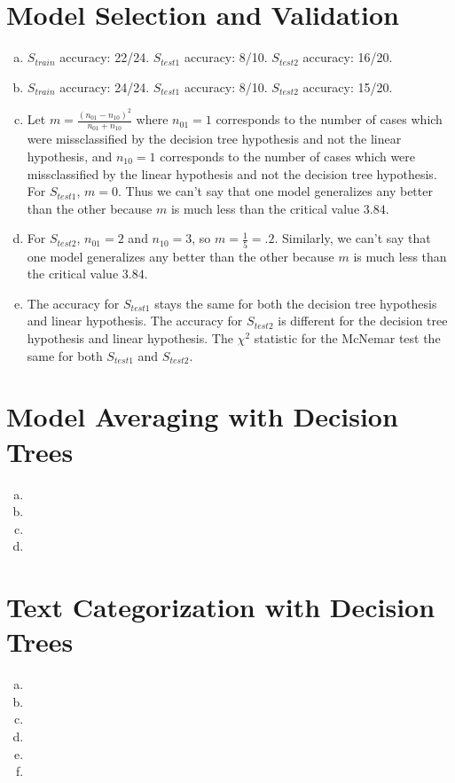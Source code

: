 \documentclass{article}
\begin{document}
\thispagestyle{fancy}

\section{Model Selection and Validation}

\begin{enumerate}[(a)]
\item $S_{train}$ accuracy: 22/24. $S_{test1}$ accuracy: 8/10. $S_{test2}$ accuracy: 16/20. 
\item $S_{train}$ accuracy: 24/24. $S_{test1}$ accuracy: 8/10. $S_{test2}$ accuracy: 15/20. 
\item Let $m=\frac{(n_{01}-n_{10})^2}{n_{01}+n_{10}}$ where $n_{01}=1$ corresponds to the number of cases which were missclassified by the decision tree hypothesis and not the linear hypothesis, and $n_{10}=1$ corresponds to the number of cases which were missclassified by the linear hypothesis and not the decision tree hypothesis. For $S_{test1}$, $m=0$. Thus we can't say that one model generalizes any better than the other because $m$ is much less than the critical value $3.84$.
\item For $S_{test2}$, $n_{01}=2$ and $n_{10}=3$, so $m=\frac{1}{5}=.2$. Similarly, we can't say that one model generalizes any better than the other because $m$ is much less than the critical value $3.84$.
\item The accuracy for $S_{test1}$ stays the same for both the decision tree hypothesis and linear hypothesis. The accuracy for $S_{test2}$ is different for the decision tree hypothesis and linear hypothesis. The $\chi^2$ statistic for the McNemar test the same for both $S_{test1}$ and $S_{test2}$.
\end{enumerate}

\section{Model Averaging with Decision Trees}

\begin{enumerate}[(a)]
\item 
\item 
\item 
\item
\end{enumerate}

\section{Text Categorization with Decision Trees}

\begin{enumerate}[(a)]
\item 
\item 
\item 
\item
\item 
\item 
\end{enumerate}
\end{document}
